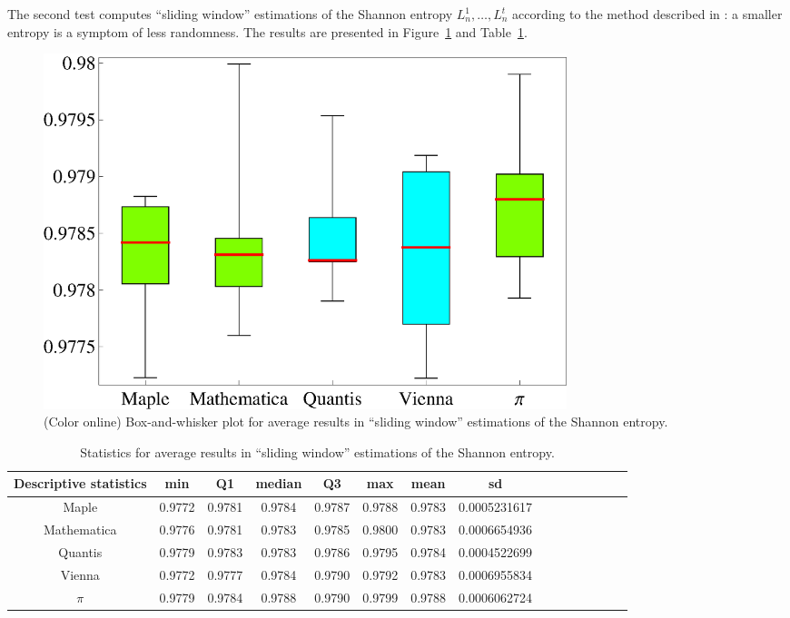 \documentclass[%
 preprint,
 showpacs,
 showkeys,
 preprintnumbers,
 amsmath,amssymb,
 aps,
 prl,
  longbibliography,
 ]{revtex4-1}
\begin{document}
The second test
computes  ``sliding window'' estimations of the Shannon entropy $L_n^1, \ldots ,L_n^t$ according to the method described in
\cite{Wyner}: a smaller  entropy is a symptom of  less randomness.
The results are presented in
Figure~\ref{fig:example2} and Table~\ref{tab:2}.

\begin{figure}[htbp] %
   \centering
   \includegraphics[width=6in]{2009-QvPR-boxLentropy}
   \caption{(Color online) Box-and-whisker plot for average results in ``sliding window'' estimations of the Shannon entropy.}
   \label{fig:example2}
\end{figure}


\begin{table}
\caption{Statistics for average results in ``sliding window''
estimations of the Shannon entropy.}\label{tab:2}
\begin{center}
\begin{tabular}
[c]{c c c c c c c c c c c c c c c }%
\hline\hline
Descriptive statistics & min & Q1 & median & Q3 & max & mean & sd\\\hline
Maple & 0.9772 & 0.9781 & 0.9784 & 0.9787 & 0.9788 & 0.9783 & 0.0005231617\\
Mathematica & 0.9776 & 0.9781 & 0.9783 & 0.9785 & 0.9800 & 0.9783 & 0.0006654936\\
Quantis & 0.9779 & 0.9783 & 0.9783 & 0.9786 & 0.9795 & 0.9784 & 0.0004522699\\
Vienna & 0.9772 & 0.9777 & 0.9784 & 0.9790 & 0.9792 & 0.9783 & 0.0006955834\\
$\pi$ & 0.9779 & 0.9784 & 0.9788 & 0.9790 & 0.9799 & 0.9788 & 0.0006062724\\\hline\hline
\end{tabular}
\end{center}
\end{table}
\end{document}
